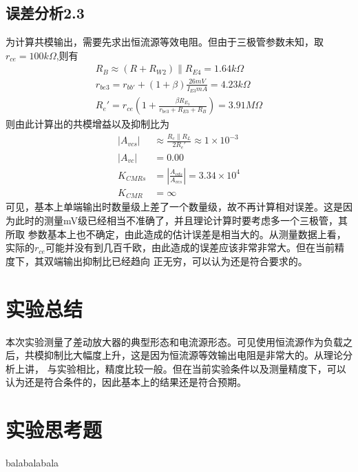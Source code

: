 \documentclass[a4paper,11pt,UTF8]{ctexart}
\begin{document}
\subsection{误差分析2.3}
为计算共模输出，需要先求出恒流源等效电阻。但由于三极管参数未知，取$r_{ce}=100k\Omega$,则有
\begin{equation}
  \begin{aligned}
    R_B\approx(R+R_{W2})\parallel R_{E4}=1.64k\Omega\\
    r_{be3}=r_{bb'}+(1+\beta)\frac{26mV}{I_{E3}mA}=4.23k\Omega\\
    R_e'=r_{ce}(1+\frac{\beta R_{E_3}}{r_{be3}+R_{E3}+R_{B}})=3.91M\Omega
  \end{aligned}
\end{equation}
则由此计算出的共模增益以及抑制比为
\begin{equation}
  \begin{aligned}
    \left | A_{vcs}\right |&\approx\frac{R_c\parallel R_L}{2R_e'}\approx1\times10^{-3}\\
    \left | A_{vc}\right |&=0.00\\
    K_{CMRs}&=\left |\frac{A_{vds}}{A_{vcs}}\right |=3.34\times10^{4}\\
    K_{CMR}&=\infty
  \end{aligned}
\end{equation}
可见，基本上单端输出时数量级上差了一个数量级，故不再计算相对误差。这是因为此时的测量mV级已经相当不准确了，并且理论计算时要考虑多一个三极管，其所取
参数基本上也不确定，由此造成的估计误差是相当大的。从测量数据上看，实际的$r_{ce}$可能并没有到几百千欧，由此造成的误差应该非常非常大。但在当前精度下，其双端输出抑制比已经趋向
正无穷，可以认为还是符合要求的。
\section{实验总结}
本次实验测量了差动放大器的典型形态和电流源形态。可见使用恒流源作为负载之后，共模抑制比大幅度上升，这是因为恒流源等效输出电阻是非常大的。从理论分析上讲，
与实验相比，精度比较一般。但在当前实验条件以及测量精度下，可以认为还是符合条件的，因此基本上的结果还是符合预期。
\section{实验思考题}
balabalabala
\end{document}
